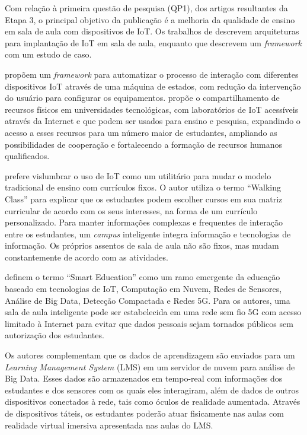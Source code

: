 \documentclass[portuguese]{textolivre}
\begin{document}
Com relação à primeira questão de pesquisa (QP1), dos artigos resultantes da Etapa 3, o principal objetivo da publicação é a melhoria da qualidade de ensino em sala de aula com dispositivos de IoT. Os trabalhos de \textcite{oteri_application_2020,nai_design_2022,liu_internet_2021,petrovic_designing_2021} descrevem arquiteturas para implantação de IoT em sala de aula, enquanto que \textcite{chang_learning_2020} descrevem um \textit{framework} com um estudo de caso. 

\textcite{chang_learning_2020} propõem um \textit{framework} para automatizar o processo de interação com diferentes dispositivos IoT através de uma máquina de estados, com redução da intervenção do usuário para configurar os equipamentos. \textcite{lin_iot_2020} propõe o compartilhamento de recursos físicos em universidades tecnológicas, com laboratórios de IoT acessíveis através da Internet e que podem ser usados para ensino e pesquisa, expandindo o acesso a esses recursos para um número maior de estudantes, ampliando as possibilidades de cooperação e fortalecendo a formação de recursos humanos qualificados. 

\textcite{shan_smart_2020} prefere vislumbrar o uso de IoT como um utilitário para mudar o modelo tradicional de ensino com currículos fixos. O autor utiliza o termo “Walking Class” para explicar que os estudantes podem escolher cursos em sua matriz curricular de acordo com os seus interesses, na forma de um currículo personalizado. Para manter informações complexas e frequentes de interação entre os estudantes, um \textit{campus} inteligente integra informação e tecnologias de informação. Os próprios assentos de sala de aula não são fixos, mas mudam constantemente de acordo com as atividades. 

\textcite{memos_revolutionary_2020} definem o termo “Smart Education” como um ramo emergente da educação baseado em tecnologias de IoT, Computação em Nuvem, Redes de Sensores, Análise de Big Data, Detecção Compactada e Redes 5G. Para os autores, uma sala de aula inteligente pode ser estabelecida em uma rede sem fio 5G com acesso limitado à Internet para evitar que dados pessoais sejam tornados públicos sem autorização dos estudantes. 

Os autores complementam que os dados de aprendizagem são enviados para um \textit{Learning Management System} (LMS) em um servidor de nuvem para análise de Big Data. Esses dados são armazenados em tempo-real com informações dos estudantes e dos sensores com os quais eles interagiram, além de dados de outros dispositivos conectados à rede, tais como óculos de realidade aumentada. Através de dispositivos táteis, os estudantes poderão atuar fisicamente nas aulas com realidade virtual imersiva apresentada nas aulas do LMS. 
\end{document}
